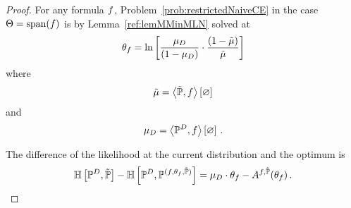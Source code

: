 \begin{proof}
	For any formula $f$, Problem~\ref{prob:restrictedNaiveCE}  in the case $\Theta = \mathrm{span}(f) $ is by Lemma~\ref{ref:lemMMinMLN} solved at
		\[ \theta_{f} = \ln \left[ \frac{\mu_{D}}{(1-\mu_{D})}\cdot \frac{(1-\tilde{\mu})}{\tilde{\mu}} \right]  \]
	where
		\[ \tilde{\mu} = \left\langle \tilde{\mathbb{P}},f\right\rangle \left[ \varnothing \right] \]
	and
		\[ \mu_{D} = \left\langle \mathbb{P}^{D},f\right\rangle \left[ \varnothing \right] \, . \]
	
	The difference of the likelihood at the current distribution and the optimum is
	\begin{align*}
		\mathbb{H}\left[\mathbb{P}^{D},\tilde{\mathbb{P}}\right]
		- \mathbb{H}\left[\mathbb{P}^{D},\mathbb{P}^{(f,\theta_{f},\tilde{\mathbb{P}})}\right]
		= \mu_{D} \cdot \theta_{f} - A^{f,\tilde{\mathbb{P}}}(\theta_{f}) \, .
	\end{align*}
	

\end{proof}
